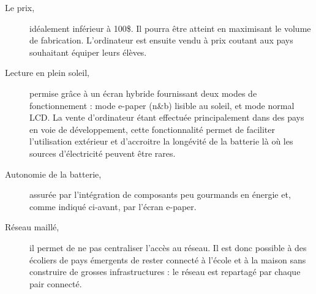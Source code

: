 \begin{description}
  \item [Le prix,] idéalement inférieur à 100\$. Il pourra être atteint en maximisant le volume de fabrication. L'ordinateur est ensuite vendu à prix coutant aux pays souhaitant équiper leurs élèves.
  \item [Lecture en plein soleil,] permise grâce à un écran hybride fournissant deux modes de fonctionnement : mode e-paper (n\&{}b) lisible au soleil, et mode normal LCD. La vente d'ordinateur étant effectuée principalement dans des pays en voie de développement, cette fonctionnalité permet de faciliter l'utilisation extérieur et d'accroitre la longévité de la batterie là où les sources d'électricité peuvent être rares.
  \item [Autonomie de la batterie,] assurée par l'intégration de composants peu gourmands en énergie et, comme indiqué ci-avant, par l'écran e-paper.
  \item [Réseau maillé,] il permet de ne pas centraliser l'accès au réseau. Il est donc possible à des écoliers de pays émergents de rester connecté à l'école et à la maison sans construire de grosses infrastructures : le réseau est repartagé par chaque pair connecté.
\end{description}

